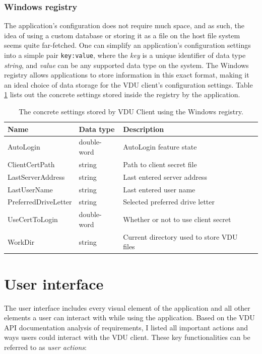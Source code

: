 \subsubsection{Windows registry}
The application's configuration does not require much space, and as such, the idea of using a custom database or storing it as a file on the host file system seems quite far-fetched. 
One can simplify an application's configuration settings into a simple pair \lstinline{key:value}, where the \textit{key} is a unique identifier of data type \textit{string}, and \textit{value} can be any supported data type on the system. The Windows registry allows applications to store information in this exact format, making it an ideal choice of data storage for the VDU client's configuration settings. Table \ref{vduregistrytable} lists out the concrete settings stored inside the registry by the application.
\begin{table}[H]
\centering
\label{vduregistrytable}
\begin{tabular}{|l|l|l|l|}
\hline
\textbf{Name} & \textbf{Data type} & \textbf{Description} \\ \hline
 AutoLogin & double-word & AutoLogin feature state \\ \hline
 ClientCertPath & string & Path to client secret file \\ \hline
 LastServerAddress & string & Last entered server address \\ \hline
 LastUserName & string & Last entered user name \\ \hline
 PreferredDriveLetter & string & Selected preferred drive letter \\ \hline
 UseCertToLogin & double-word & Whether or not to use client secret \\ \hline
 WorkDir & string & Current directory used to store VDU files  \\ \hline
\end{tabular}
\caption{The concrete settings stored by VDU Client using the Windows registry.}
\end{table} 

\section{User interface}
The user interface includes every visual element of the application and all other elements a user can interact with while using the application. Based on the VDU API documentation analysis of requirements, I listed all important actions and ways users could interact with the VDU client. These key functionalities can be referred to as \textit{user actions}: 

